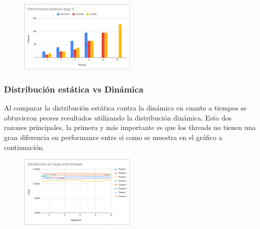\documentclass[conference]{IEEEtran}
\begin{document}
\begin{figure}[h]
  \centering
   \includegraphics[width=0.5\textwidth]{Captura4.PNG}
 \end{figure}

\newpage

\subsubsection{Distribución estática vs Dinámica}

Al comparar la distribución estática contra la dinámica en cuanto a tiempos se obtuvieron peores resultados utilizando la distribución dinámica. Esto dos razones principales, la primera y más importante es que los threads no tienen una gran diferencia en performance entre si como se muestra en el gráfico a continuación.

\begin{figure}[h]
  \centering
   \includegraphics[width=0.5\textwidth]{Captura6.PNG}
 \end{figure}
\end{document}
